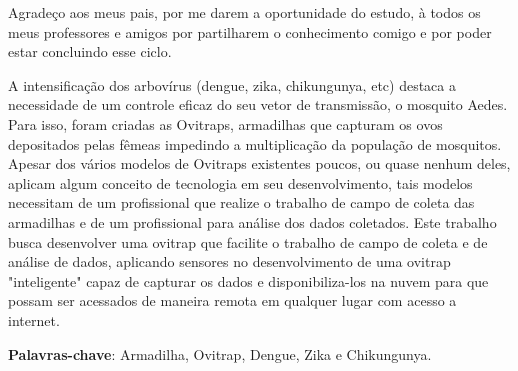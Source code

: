 \documentclass[
	12pt,				%
	openright,			%
	oneside,			%
	a4paper,			%
	chapter=TITLE,		%
	english,			%
	brazil				%
	]{abntex2}
\begin{document}

\begin{agradecimentos}
Agradeço aos meus pais, por me darem a oportunidade do estudo, à todos os meus professores e amigos por partilharem o conhecimento 
comigo e por poder estar concluindo esse ciclo.

\end{agradecimentos}




\setlength{\absparsep}{18pt} %

\begin{resumo}

A intensificação dos arbovírus (dengue, zika, chikungunya, etc) destaca a necessidade de um controle eficaz do seu vetor de transmissão, 
o mosquito Aedes. Para isso, foram criadas as Ovitraps, armadilhas que capturam os ovos depositados pelas fêmeas impedindo a multiplicação 
da população de mosquitos. Apesar dos vários modelos de Ovitraps existentes poucos, ou quase nenhum deles, aplicam algum conceito de tecnologia
 em seu desenvolvimento, tais modelos necessitam de um profissional que realize o trabalho de campo de coleta das armadilhas e de um 
 profissional para análise dos dados coletados. Este trabalho busca desenvolver uma ovitrap que facilite o trabalho de campo de coleta 
 e de análise de dados, aplicando sensores no desenvolvimento de uma ovitrap "inteligente" capaz de capturar os dados e 
 disponibiliza-los na nuvem para que possam ser acessados de maneira remota em qualquer lugar com acesso a internet.

\textbf{Palavras-chave}:  Armadilha, Ovitrap, Dengue, Zika e Chikungunya.

\end{resumo}
\end{document}
